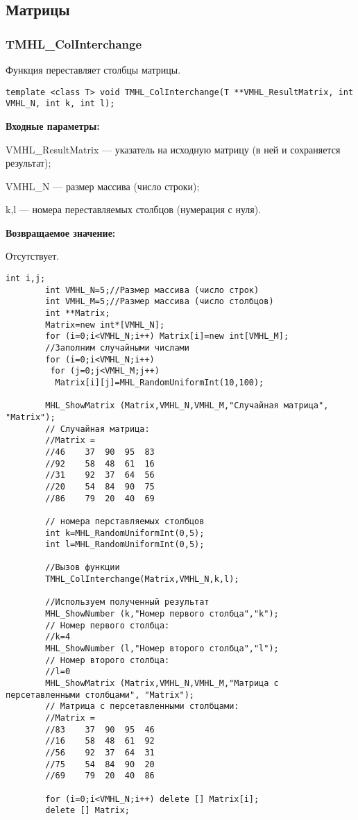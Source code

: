 \documentclass[a4paper,12pt]{article}
\begin{document}
\subsection{Матрицы}

\subsubsection{TMHL\_ColInterchange}\label{TMHL_ColInterchange}

Функция переставляет столбцы матрицы.


\begin{lstlisting}[label=code_syntax_TMHL_ColInterchange,caption=Синтаксис]
template <class T> void TMHL_ColInterchange(T **VMHL_ResultMatrix, int VMHL_N, int k, int l);
\end{lstlisting}

\textbf{Входные параметры:} 
 
VMHL\_ResultMatrix --- указатель на исходную матрицу (в ней и сохраняется результат);
 
VMHL\_N --- размер массива (число строки);
 
k,l --- номера переставляемых столбцов (нумерация с нуля).

\textbf{Возвращаемое значение:}

Отсутствует.


\begin{lstlisting}[label=code_use_TMHL_ColInterchange,caption=Пример использования]
        int i,j;
        int VMHL_N=5;//Размер массива (число строк)
        int VMHL_M=5;//Размер массива (число столбцов)
        int **Matrix;
        Matrix=new int*[VMHL_N];
        for (i=0;i<VMHL_N;i++) Matrix[i]=new int[VMHL_M];
        //Заполним случайными числами
        for (i=0;i<VMHL_N;i++)
         for (j=0;j<VMHL_M;j++)
          Matrix[i][j]=MHL_RandomUniformInt(10,100);

        MHL_ShowMatrix (Matrix,VMHL_N,VMHL_M,"Случайная матрица", "Matrix");
        // Случайная матрица:
        //Matrix =	
        //46	37	90	95	83
        //92	58	48	61	16
        //31	92	37	64	56
        //20	54	84	90	75
        //86	79	20	40	69

        // номера перставляемых столбцов
        int k=MHL_RandomUniformInt(0,5);
        int l=MHL_RandomUniformInt(0,5);

        //Вызов функции
        TMHL_ColInterchange(Matrix,VMHL_N,k,l);

        //Используем полученный результат
        MHL_ShowNumber (k,"Номер первого столбца","k");
        // Номер первого столбца:
        //k=4
        MHL_ShowNumber (l,"Номер второго столбца","l");
        // Номер второго столбца:
        //l=0
        MHL_ShowMatrix (Matrix,VMHL_N,VMHL_M,"Матрица с персетавленными столбцами", "Matrix");
        // Матрица с персетавленными столбцами:
        //Matrix =	
        //83	37	90	95	46
        //16	58	48	61	92
        //56	92	37	64	31
        //75	54	84	90	20
        //69	79	20	40	86

        for (i=0;i<VMHL_N;i++) delete [] Matrix[i];
        delete [] Matrix;
\end{lstlisting}
\end{document}
